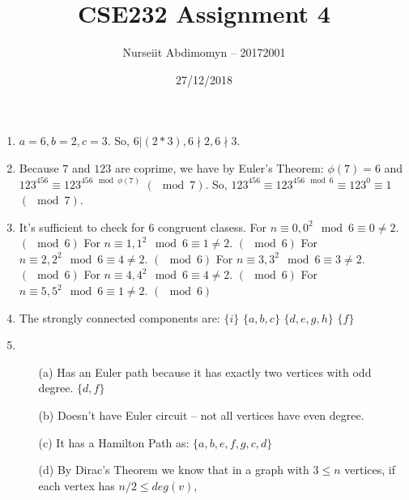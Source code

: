 \documentclass[12pt]{article}
\title{CSE232 Assignment 4}
\author{Nurseiit Abdimomyn -- 20172001}
\date{27/12/2018}
\begin{document}
\maketitle

\begin{enumerate}
  \item
    $a = 6, b = 2, c = 3$. So, $6 | (2 * 3), 6 \nmid 2, 6 \nmid 3$.
  \item
    Because $7$ and $123$ are coprime, we have by Euler's Theorem:
    \newline
    $\phi (7) = 6$ and $123^{456} \equiv 123^{456 \mod \phi(7)}$ $(\mod 7)$.
    \newline
    So, $123^{456} \equiv 123^{456 \mod 6} \equiv 123^0 \equiv 1$ $(\mod 7)$.
    
  \item
    It's sufficient to check for $6$ congruent clasess. \newline
    For $n \equiv 0, 0^2 \mod 6 \equiv 0 \neq 2$. $(\mod 6)$\newline
    For $n \equiv 1, 1^2 \mod 6 \equiv 1 \neq 2$. $(\mod 6)$\newline
    For $n \equiv 2, 2^2 \mod 6 \equiv 4 \neq 2$. $(\mod 6)$\newline
    For $n \equiv 3, 3^2 \mod 6 \equiv 3 \neq 2$. $(\mod 6)$\newline
    For $n \equiv 4, 4^2 \mod 6 \equiv 4 \neq 2$. $(\mod 6)$\newline
    For $n \equiv 5, 5^2 \mod 6 \equiv 1 \neq 2$. $(\mod 6)$\newline
  \item
    The strongly connected components are: \newline
    $\{i\}$ \newline
    $\{a, b, c\}$ \newline
    $\{d, e, g, h\}$ \newline
    $\{f\}$ \newline
  \item
    \begin{itemize}
      \item [(a) ]
        Has an Euler path because it has exactly two vertices with odd degree. $\{d, f\}$
      \item [(b) ]
        Doesn't have Euler circuit -- not all vertices have even degree.
      \item [(c) ]
        It has a Hamilton Path as: $\{a, b, e, f, g, c, d\}$
      \item [(d) ]
        By Dirac's Theorem we know that in a graph with $3 \leq n$ vertices, if each vertex has $n/2 \leq deg(v)$, \newline

\end{itemize}
\end{enumerate}
\end{document}
